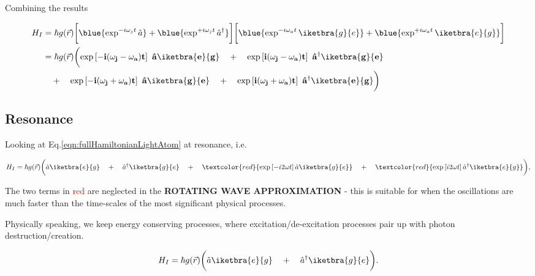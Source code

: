 Combining the results

\begin{equation}
  \begin{aligned}
    H_I & = \hbar g(\vec{r})\bigg[\blue{\exp^{-i\omega_jt}\hat{a}}+\blue{\exp^{+i\omega_jt}\hat{a}^\dagger}\bigg]\bigg[\blue{\exp^{-i\omega_at}\iketbra{g}{e}}+\blue{\exp^{+i\omega_at}\iketbra{e}{g}}\bigg] \\
    & = \hbar g(\vec{r})\bigg(\mathbf{\exp\left[-i(\omega_j-\omega_a)t\right]\ \hat{a}\iketbra{e}{g}} \quad + \quad \mathbf{\exp\left[i(\omega_j-\omega_a)t\right]\ \hat{a}^\dagger\iketbra{g}{e}} \\
    &  \quad  +  \quad  \mathbf{\exp\left[-i(\omega_j+\omega_a)t\right]\
      \hat{a}\iketbra{g}{e}}           \quad           +           \quad
    \mathbf{\exp\left[i(\omega_j+\omega_a)t\right]\
      \hat{a}^\dagger\iketbra{e}{g}}\bigg)
  \end{aligned}
  \label{eqn:fullHamiltonianLightAtom}
\end{equation}

\subsection{Resonance}

Looking   at   Eq.\eqref{eqn:fullHamiltonianLightAtom}   at   resonance,
i.e. 

\begin{equation}
  H_I = \hbar g(\vec{r}) \bigg(\hat{a}\iketbra{e}{g} \quad+\quad \hat{a}^\dagger\iketbra{g}{e} \quad+\quad \textcolor{red}{\exp\left[-i2\omega t\right]\hat{a}\iketbra{g}{e}} \quad+\quad \textcolor{red}{\exp\left[i2\omega t\right]\hat{a}^\dagger\iketbra{e}{g}}\bigg),
\end{equation}

\noindent The  two terms  in \textcolor{red}{red}  are neglected  in the
\textbf{\large ROTATING WAVE APPROXIMATION} -  this is suitable for when
the  oscillations are  much  faster  than the  time-scales  of the  most
significant physical processes.

Physically  speaking,   we  keep  energy  conserving   processes,  where
excitation/de-excitation     processes    pair     up    with     photon
destruction/creation.

\begin{equation}
  H_I = \hbar g(\vec{r}) \bigg(\hat{a}\iketbra{e}{g} \quad+\quad \hat{a}^\dagger\iketbra{g}{e} \bigg).
  \label{eqn:rwa1}
\end{equation}
\vspace{6ex}

